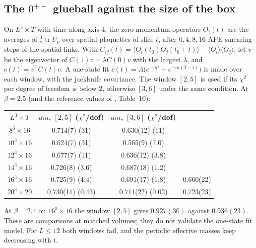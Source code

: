 \subsection{The \texorpdfstring{$0^{++}$}{0++} glueball against the size of the box}\label{ym:num-glueball}
On $L^3\times T$ with time along axis 4, the zero-momentum operators
$O_i(t)$ are the averages of $\frac12\operatorname{tr}U_p$ over spatial
plaquettes of slice $t$, after $0,4,8,16$ APE smearing steps of the spatial
links. With $C_{ij}(t)=\langle O_i(t_0)O_j(t_0+t)\rangle-\langle O_i\rangle
\langle O_j\rangle$, let $v$ be the eigenvector of $C(1)v=\lambda C(0)v$ with
the largest $\lambda$, and $c(t)=v^{\mathsf T}C(t)v$. A one-state fit
$c(t)=A\big(e^{-mt}+e^{-m(T-t)}\big)$ is made over each window, with the
jackknife covariance. The window $[2,5]$ is used if its $\chi^2$ per degree of
freedom is below $2$, otherwise $[3,6]$ under the same condition. At $\beta=2.5$
(and the reference values of \cite{Teper1998}, Table~10):
\begin{center}
\begin{tabular}{cccc}
$L^3\times T$ & $am$, $[2,5]$ ($\chi^2$/dof) & $am$, $[3,6]$ ($\chi^2$/dof) &
 \cite{Teper1998}\\\hline
$8^3\times16$ & 0.714(7) (31) & 0.630(12) (11) & \\
$10^3\times16$ & 0.624(7) (31) & 0.565(9) (7.0) & \\
$12^3\times16$ & 0.677(7) (11) & 0.636(12) (3.8) & \\
$14^3\times16$ & 0.726(8) (3.6) & 0.687(18) (1.2) & \\
$16^3\times16$ & 0.725(9) (4.4) & 0.691(17) (1.8) & 0.660(22)\\
$20^3\times20$ & 0.730(11) (0.43) & 0.711(22) (0.02) & 0.723(23)
\end{tabular}
\end{center}
At $\beta=2.4$ on $16^3\times16$ the window $[2,5]$ gives $0.927(30)$ against
$0.936(23)$. These are comparisons at matched volumes; they do not validate
the one-state fit model. For $L\le12$ both windows fail, and the periodic
effective masses keep decreasing with $t$.

